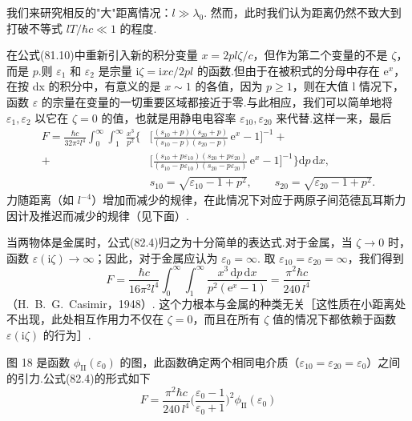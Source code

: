 我们来研究相反的"大"距离情况：$l\gg\lambda_0$. 然而，此时我们认为距离仍然不致大到打破不等式 $lT/\hbar c\ll 1$ 的程度.

在公式(81.10)中重新引入新的积分变量 $x=2pl\zeta/c$，但作为第二个变量的不是 $\zeta$，而是 $p$.则 $\varepsilon_1$ 和 $\varepsilon_2$ 是宗量 $\mathrm{i}\zeta=\mathrm{i}xc/2pl$ 的函数.但由于在被积式的分母中存在 $\mathrm{e}^{x}$，在按 dx 的积分中，有意义的是 $x\sim 1$ 的各值，因为 $p\geqslant 1$，则在大值 l 情况下，函数 $\varepsilon$ 的宗量在变量的一切重要区域都接近于零.与此相应，我们可以简单地将 $\varepsilon_1,\varepsilon_2$ 以它在 $\zeta=0$ 的值，也就是用静电电容率 $\varepsilon_{10},\varepsilon_{20}$ 来代替.这样一来，最后
\begin{equation}
  \begin{aligned}
    F=\frac{\hbar c}{32\pi^{2}l^{4}}\int_{0}^{\infty}\!\!\int_{1}^{\infty}\frac{x^{3}}{p^{2}}\biggl\{&\biggl[\frac{(s_{10}+p)(s_{20}+p)}{(s_{10}-p)(s_{20}-p)}\,\mathrm{e}^{x}-1\biggr]^{-1}+\\
    +&\biggl[\frac{(s_{10}+p\varepsilon_{10})(s_{20}+p\varepsilon_{20})}{(s_{10}-p\varepsilon_{10})(s_{20}-p\varepsilon_{20})}\,\mathrm{e}^{x}-1\biggr]^{-1}\biggr\}\mathrm{d}p\,\mathrm{d}x,\\
    &s_{10}=\sqrt{\varepsilon_{10}-1+p^{2}},\qquad s_{20}=\sqrt{\varepsilon_{20}-1+p^{2}}.
  \end{aligned}
\end{equation}
力随距离（如 $l^{-4}$）增加而减少的规律，在此情况下对应于两原子间范德瓦耳斯力因计及推迟而减少的规律（见下面）.

当两物体是金属时，公式(82.4)归之为十分简单的表达式.对于金属，当 $\zeta\to 0$ 时，函数 $\varepsilon(\mathrm{i}\zeta)\to\infty$；因此，对于金属应认为 $\varepsilon_0=\infty$. 取 $\varepsilon_{10}=\varepsilon_{20}=\infty$，我们得到
\begin{equation}
  F=\frac{\hbar c}{16\pi^{2}l^{4}}\int_{0}^{\infty}\!\!\int_{1}^{\infty}\frac{x^{3}\,\mathrm{d}p\,\mathrm{d}x}{p^{2}(\mathrm{e}^{x}-1)}=\frac{\pi^{2}\hbar c}{240\,l^{4}}
\end{equation}
（H.~B.~G.~Casimir，1948）. 这个力根本与金属的种类无关［这性质在小距离处不出现，此处相互作用力不仅在 $\zeta=0$，而且在所有 $\zeta$ 值的情况下都依赖于函数 $\varepsilon(\mathrm{i}\zeta)$ 的行为］.

图 18 是函数 $\phi_{\mathrm{II}}(\varepsilon_0)$ 的图，此函数确定两个相同电介质（$\varepsilon_{10}=\varepsilon_{20}=\varepsilon_0$）之间的引力.公式(82.4)的形式如下
\begin{equation}
  F=\frac{\pi^{2}\hbar c}{240\,l^{4}}\biggl(\frac{\varepsilon_0-1}{\varepsilon_0+1}\biggr)^{2}\phi_{\mathrm{II}}(\varepsilon_0)
\end{equation}

